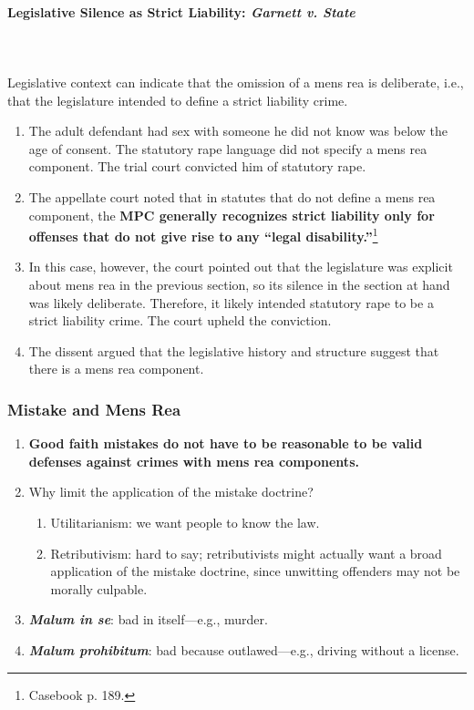 \paragraph{Legislative Silence as Strict Liability: \emph{Garnett v. State}}
~\\\\
Legislative context can indicate that the omission of a mens rea is 
deliberate, i.e., that the legislature intended to define a strict liability 
crime.

\begin{enumerate}
    \item The adult defendant had sex with someone he did not know was below 
    the age of consent. The statutory rape language did not specify a mens rea 
    component. The trial court convicted him of statutory rape.
    \item The appellate court noted that in statutes that do not define a mens 
    rea component, the \textbf{MPC generally recognizes strict liability only for 
    offenses that do not give rise to any ``legal 
    disability.''}\footnote{Casebook p. 189.}
    \item In this case, however, the court pointed out that the legislature 
    was explicit about mens rea in the previous section, so its silence in the 
    section at hand was likely deliberate. Therefore, it likely intended 
    statutory rape to be a strict liability crime. The court upheld the 
    conviction.
    \item The dissent argued that the legislative history and structure 
    suggest that there is a mens rea component.
\end{enumerate}

\subsubsection{Mistake and Mens Rea}

\begin{enumerate}
    \item \textbf{Good faith mistakes do not have to be reasonable to be valid 
    defenses against crimes with mens rea components.}
    \item Why limit the application of the mistake doctrine?
    \begin{enumerate}
        \item Utilitarianism: we want people to know the law.
        \item Retributivism: hard to say; retributivists might actually want a 
        broad application of the mistake doctrine, since unwitting offenders 
        may not be morally culpable.
    \end{enumerate}
    \item \textbf{\emph{Malum in se}}: bad in itself---e.g., murder.
    \item \textbf{\emph{Malum prohibitum}}: bad because outlawed---e.g., 
    driving without a license.
\end{enumerate}

